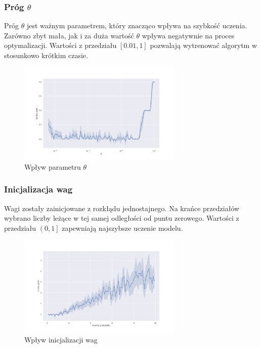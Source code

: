 \documentclass{article}
\begin{document}
\subsubsection{Próg $\theta$}
Próg $\theta$ jest ważnym parametrem, który znacząco wpływa na szybkość uczenia.
Zarówno zbyt mała, jak i za duża wartość $\theta$ wpływa negatywnie na proces optymalizacji.
Wartości z przedziału $\left[0.01, 1\right]$ pozwalają wytrenować algorytm w stosunkowo krótkim czasie.

\begin{figure}[h]
  \caption{Wpływ parametru $\theta$}
  \centering
    \includegraphics[width=0.7\textwidth]{images/02_per_theta.png}
\end{figure}

\subsubsection{Inicjalizacja wag}

Wagi zostały zainicjowane z rozkłądu jednostajnego.
Na krańce przedziałów wybrano liczby leżące w tej samej odległości od puntu zerowego.
Wartości z przedziału $\left(0, 1\right]$ zapewniają najszybsze uczenie modelu.

\begin{figure}[h]
  \caption{Wpływ inicjalizacji wag}
  \centering
    \includegraphics[width=0.7\textwidth]{images/03_per_interval.png}
\end{figure}
\end{document}

